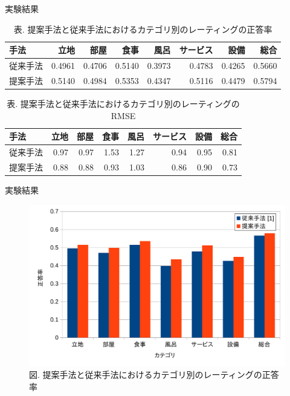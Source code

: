 \documentclass[unicode,10pt]{beamer}
\begin{document}
\begin{frame}{実験結果}{}
  \begin{table}
    \centering
    \caption{\large %
             表. 提案手法と従来手法におけるカテゴリ別のレーティングの正答率}
    \begin{tabular}{l | r r r r r r r}
      手法 & 立地 & 部屋 & 食事 & 風呂 & サービス & 設備 & 総合 \\
      \hline
      従来手法 & 0.4961 & 0.4706 & 0.5140 & 0.3973 & 0.4783 & 0.4265 & 0.5660 \\
      提案手法 & 0.5140 & 0.4984 & 0.5353 & 0.4347 & 0.5116 & 0.4479 & 0.5794 \\
    \end{tabular}
  \end{table}

  \begin{table}
    \centering
    \caption{\large %
             表. 提案手法と従来手法におけるカテゴリ別のレーティングのRMSE}
    \begin{tabular}{l | r r r r r r r}
      手法 & 立地 & 部屋 & 食事 & 風呂 & サービス & 設備 & 総合 \\
      \hline
      従来手法 & 0.97 & 0.97 & 1.53 & 1.27 & 0.94 & 0.95 & 0.81 \\
      提案手法 & 0.88 & 0.88 & 0.93 & 1.03 & 0.86 & 0.90 & 0.73 \\
    \end{tabular}
  \end{table}
\end{frame}

\begin{frame}{実験結果}{}
  \begin{figure}
    \centering
    \caption{\large %
             図. 提案手法と従来手法におけるカテゴリ別のレーティングの正答率}
    \includegraphics{fig/graph_of_accuracies_per_category.pdf}
  \end{figure}
\end{frame}
\end{document}
